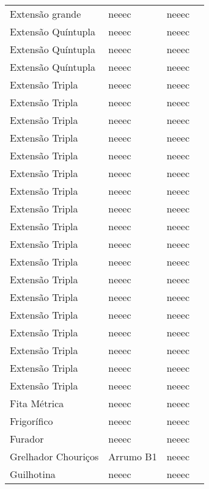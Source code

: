 \begin{longtable}{Xlll}
Extensão grande & \acrshort{neeec} & \acrshort{neeec} & \\
Extensão Quíntupla & \acrshort{neeec} & \acrshort{neeec} & \\
Extensão Quíntupla & \acrshort{neeec} & \acrshort{neeec} & \\
Extensão Quíntupla & \acrshort{neeec} & \acrshort{neeec} &\\ 
Extensão Tripla & \acrshort{neeec} & \acrshort{neeec} & \\
Extensão Tripla & \acrshort{neeec} & \acrshort{neeec} & \\
Extensão Tripla & \acrshort{neeec} & \acrshort{neeec} & \\
Extensão Tripla & \acrshort{neeec} & \acrshort{neeec} & \\
Extensão Tripla & \acrshort{neeec} & \acrshort{neeec} & \\
Extensão Tripla & \acrshort{neeec} & \acrshort{neeec} & \\
Extensão Tripla & \acrshort{neeec} & \acrshort{neeec} & \\
Extensão Tripla & \acrshort{neeec} & \acrshort{neeec} & \\
Extensão Tripla & \acrshort{neeec} & \acrshort{neeec} & \\
Extensão Tripla & \acrshort{neeec} & \acrshort{neeec} & \\
Extensão Tripla & \acrshort{neeec} & \acrshort{neeec} & \\
Extensão Tripla & \acrshort{neeec} & \acrshort{neeec} & \\
Extensão Tripla & \acrshort{neeec} & \acrshort{neeec} & \\
Extensão Tripla & \acrshort{neeec} & \acrshort{neeec} & \\
Extensão Tripla & \acrshort{neeec} & \acrshort{neeec} & \\
Extensão Tripla & \acrshort{neeec} & \acrshort{neeec} & \\
Extensão Tripla & \acrshort{neeec} & \acrshort{neeec} & \\
Extensão Tripla & \acrshort{neeec} & \acrshort{neeec} & \\
Fita Métrica & \acrshort{neeec} & \acrshort{neeec} & \\
Frigorífico & \acrshort{neeec} & \acrshort{neeec} & \\
Furador & \acrshort{neeec} & \acrshort{neeec} & \\
Grelhador Chouriços & Arrumo B1 & \acrshort{neeec} & \\
Guilhotina & \acrshort{neeec} & \acrshort{neeec} & \\

\end{longtable}
